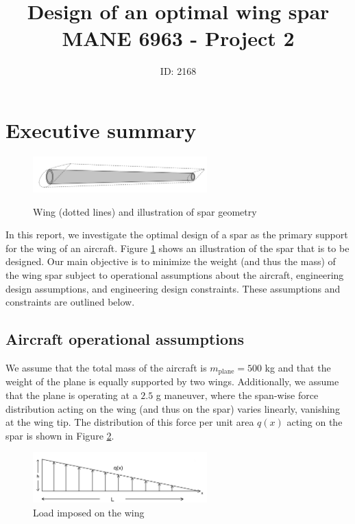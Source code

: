 \documentclass[11pt]{article}
\title{Design of an optimal wing spar\\MANE 6963 - Project 2}
\author{ID: 2168}
\date{}
\begin{document}
\maketitle
\tableofcontents
\newpage

\section{Executive summary}

\begin{figure}[hbt]
\centering
\includegraphics[width=0.6\textwidth]{spar}
\label{fig:spar}
\caption{Wing (dotted lines) and illustration of spar geometry}
\end{figure}

In this report, we investigate the optimal design of a
spar as the primary support for the wing of an aircraft.
Figure \ref{fig:spar} shows an illustration of the spar
that is to be designed. Our main objective is to minimize the
weight (and thus the mass) of the wing spar subject to
operational assumptions about the aircraft,
engineering design assumptions, and engineering
design constraints. These assumptions and
constraints are outlined below.

\subsection{Aircraft operational assumptions}

We assume that the total mass of the aircraft
is $m_{\text{plane}} = 500$ kg and that the weight
of the plane is equally supported by two wings.
Additionally, we assume that the plane is operating
at a $2.5$ g maneuver, where the span-wise force
distribution acting on the wing (and thus on the spar)
varies linearly, vanishing at the wing tip. The
distribution of this force per unit area $q(x)$
acting on the spar is shown in Figure \ref{fig:load}.

\begin{figure}[hbt]
\centering
\includegraphics[width=0.6\textwidth]{load}
\caption{Load imposed on the wing}
\label{fig:load}
\end{figure}
\end{document}
